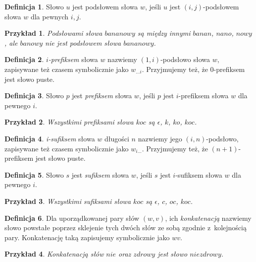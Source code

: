 \documentclass[declaration,shortabstract]{iithesis}
\theoremstyle{definition} \newtheorem{definition}{Definicja}[chapter]
\theoremstyle{plain} \newtheorem{remark}[definition]{Obserwacja}
\theoremstyle{plain} \newtheorem{theorem}[definition]{Twierdzenie}
\theoremstyle{plain} \newtheorem{example}{Przykład}[definition]
\theoremstyle{plain} \newtheorem{lemma}[definition]{Lemat}
\begin{document}
\begin{definition}
    Słowo $u$ jest podsłowem słowa $w$, jeśli $u$ jest $(i, j)$-podsłowem słowa $w$ dla pewnych $i, j$.
\end{definition}

\begin{example}
    Podsłowami słowa $bananowy$ są między innymi $banan$, $nano$, $nowy$, ale $banowy$ nie jest podsłowem słowa $bananowy$.
\end{example}

\begin{definition}
    \textit{$i$-prefiksem} słowa $w$ nazwiemy $(1, i)$-podsłowo słowa $w$, zapisywane też czasem symbolicznie jako $w_{\ldots i}$. Przyjmujemy też, że $0$-prefiksem jest słowo puste.
\end{definition}

\begin{definition}
    Słowo $p$ jest \textit{prefiksem} słowa $w$, jeśli $p$ jest $i$-prefiksem słowa $w$ dla pewnego $i$.
\end{definition}

\begin{example}
    Wszystkimi prefiksami słowa $koc$ są $\epsilon$, $k$, $ko$, $koc$.
\end{example}

\begin{definition}
    \textit{i-sufiksem} słowa $w$ długości $n$ nazwiemy jego $(i, n)$-podsłowo, zapisywane też czasem symbolicznie jako $w_{i \ldots}$. Przyjmujemy też, że $(n+1)$-prefiksem jest słowo puste.
\end{definition}

\begin{definition}
    Słowo $s$ jest \textit{sufiksem} słowa $w$, jeśli $s$ jest $i$-sufiksem słowa $w$ dla pewnego $i$.
\end{definition}

\begin{example}
    Wszystkimi sufiksami słowa $koc$ są $\epsilon$, $c$, $oc$, $koc$.
\end{example}

\begin{definition}
    Dla uporządkowanej pary słów $(w, v)$, ich \textit{konkatenacją} nazwiemy słowo powstałe poprzez sklejenie tych dwóch słów ze sobą zgodnie z~kolejnością pary. Konkatenację taką zapisujemy symbolicznie jako $wv$.
\end{definition}

\begin{example}
    Konkatenacją słów $nie$ oraz $zdrowy$ jest słowo $niezdrowy$.
\end{example}
\end{document}
